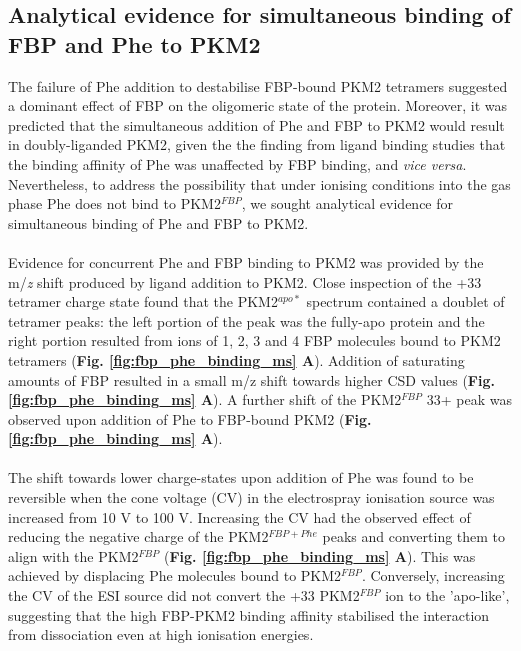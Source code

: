 \subsection{Analytical evidence for simultaneous binding of FBP and Phe to PKM2}
The failure of Phe addition to destabilise FBP-bound PKM2 tetramers suggested a dominant effect of FBP on the oligomeric state of the protein. Moreover, it was predicted that the simultaneous addition of Phe and FBP to PKM2 would result in doubly-liganded PKM2, given the the finding from ligand binding studies that the binding affinity of Phe was unaffected by FBP binding, and \textit{vice versa}. Nevertheless, to address the possibility that under ionising conditions into the gas phase Phe does not bind to PKM2$^{FBP}$, we sought analytical evidence for simultaneous binding of Phe and FBP to PKM2.
%
%
\\\\
%
%
Evidence for concurrent Phe and FBP binding to PKM2 was provided by the m/\textit{z} shift produced by ligand addition to PKM2. Close inspection of the +33 tetramer charge state found that the PKM2$^{apo \ast}$ spectrum contained a doublet of tetramer peaks: the left portion of the peak was the fully-apo protein and the right portion resulted from ions of 1, 2, 3 and 4 FBP molecules bound to PKM2 tetramers (\textbf{Fig. \ref{fig:fbp_phe_binding_ms} A}). Addition of saturating amounts of FBP resulted in a small m/z shift towards higher CSD values (\textbf{Fig. \ref{fig:fbp_phe_binding_ms} A}). A further shift of the PKM2$^{FBP}$ 33+ peak was observed upon addition of Phe to FBP-bound PKM2 (\textbf{Fig. \ref{fig:fbp_phe_binding_ms} A}).
%
%
\\\\
%
%
The shift towards lower charge-states upon addition of Phe was found to be reversible when the cone voltage (CV) in the electrospray ionisation source was increased from 10 V to 100 V. Increasing the CV had the observed effect of reducing the negative charge of the PKM2$^{FBP + Phe}$ peaks and converting them to align with the PKM2$^{FBP}$ (\textbf{Fig. \ref{fig:fbp_phe_binding_ms} A}). This was achieved by displacing Phe molecules bound to PKM2$^{FBP}$. Conversely, increasing the CV of the ESI source did not convert the +33 PKM2$^{FBP}$ ion to the 'apo-like', suggesting that the high FBP-PKM2 binding affinity stabilised the interaction from dissociation even at high ionisation energies.
%
%
%
%
%
